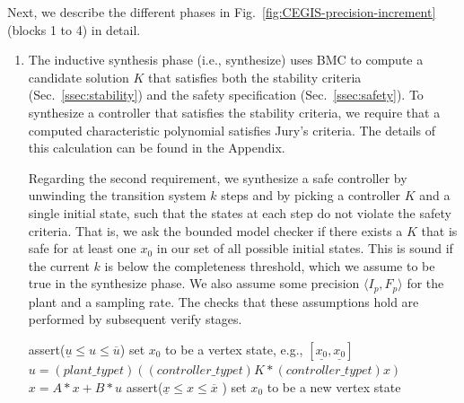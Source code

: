 \documentclass[runningheads,a4paper]{llncs}
\begin{document}
\medskip

Next, we describe the different phases in Fig.~\ref{fig:CEGIS-precision-increment}
(blocks 1 to 4) in detail.

\begin{enumerate}

\item The inductive synthesis phase (i.e., {\sc synthesize}) uses BMC to
compute a candidate solution $K$ that satisfies both the stability criteria
(Sec.~\ref{ssec:stability}) and the safety specification
(Sec.~\ref{ssec:safety}).  To synthesize a controller that satisfies the
stability criteria, we require that a computed characteristic polynomial
satisfies Jury's criteria.  The details of this calculation can be found in
the Appendix.


Regarding the second requirement, we synthesize a safe controller by
unwinding the transition system $k$ steps and by picking a controller $K$
and a single initial state, such that the states at each step do not violate
the safety criteria.  That is, we ask the bounded model checker if there
exists a $K$ that is safe for at least one $x_0$ in our set of all possible
initial states.  This is sound if the current $k$ is below the completeness
threshold, which we assume to be true in the {\sc synthesize} phase.  We
also assume some precision $\langle I_p,F_p\rangle$ for the plant and a
sampling rate.  The checks that these assumptions hold are performed by
subsequent {\sc verify} stages.



\begin{algorithm}[]
\scriptsize
\begin{algorithmic}[1]
\State assert($ \underline{u}  \leq u \leq \overline{u}$)
 \State set $x_0$ to be a vertex state, e.g., $[\underline{x_0},\underline{x_0}]$	
		\State $u = (plant\_typet)((controller\_typet)K * (controller\_typet) x)$
		\State $x = A * x + B * u$
		\State assert($\underline{x} \leq x \leq \overline{x}$ )
  	\EndWhile
  	\State set $x_0$ to be a new vertex state
  	\EndFor
\EndFunction
\end{algorithmic}
\label{alg:safetycheck}
\end{algorithm}


\end{enumerate}
\end{document}
